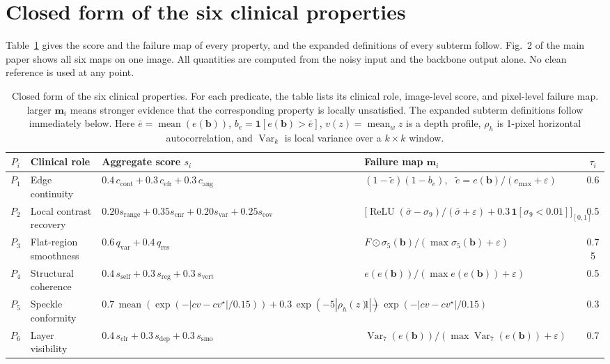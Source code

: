 \section{Closed form of the six clinical properties}
\label{sec:supp_predicates}
Table~\ref{tab:predicates_full} gives the score and the failure map of every property, and the
expanded definitions of every subterm follow. Fig.~2 of the main paper shows all six maps on one
image. All quantities are computed from the noisy input and the backbone output alone. No clean
reference is used at any point.

\begin{table}[t]
\centering
\caption{Closed form of the six clinical properties. For each predicate, the table lists its clinical role, image-level score, and pixel-level failure map. larger $\mathbf{m}_i$ means stronger evidence that the corresponding property is locally unsatisfied. The expanded subterm definitions follow immediately below. Here $\bar e=\operatorname{mean}(e(\mathbf{b}))$, $b_e=\mathbf{1}[e(\mathbf{b})>\bar e]$, $v(z)=\operatorname{mean}_w z$ is a depth profile, $\rho_h$ is 1-pixel horizontal autocorrelation, and $\operatorname{Var}_k$ is local variance over a $k\times k$ window.}
\label{tab:predicates_full}
\setlength{\tabcolsep}{2pt}
\footnotesize
\begin{tabular}{cp{}p{}p{}c}
\toprule
$P_i$ & Clinical role & Aggregate score $s_i$ & Failure map $\mathbf{m}_i$ & $\tau_i$ \\
\midrule
$P_1$ & Edge continuity &
$0.4\,c_{\text{cont}}+0.3\,c_{\text{efr}}+0.3\,c_{\text{ang}}$ &
$(1-\tilde e)(1-b_e)$, \ $\tilde e=e(\mathbf{b})/(e_{\max}+\varepsilon)$ &
0.6 \\
$P_2$ & Local contrast recovery &
$0.20 s_{\text{range}}\!+\!0.35 s_{\text{cnr}}\!+\!0.20 s_{\text{var}}\!+\!0.25 s_{\text{cov}}$ &
$\big[\operatorname{ReLU}(\bar\sigma-\sigma_9)/(\bar\sigma+\varepsilon) + 0.3\,\mathbf{1}[\sigma_9\!<\!0.01]\big]_{[0,1]}$\hspace*{-2pt} &
0.5 \\
$P_3$ & Flat-region smoothness &
$0.6\,q_{\text{var}}+0.4\,q_{\text{res}}$ &
$F \odot \sigma_5(\mathbf{b})/(\max \sigma_5(\mathbf{b})+\varepsilon)$ &
0.75 \\
$P_4$ & Structural coherence &
$0.4\,s_{\text{self}}+0.3\,s_{\text{reg}}+0.3\,s_{\text{vert}}$ &
$e(e(\mathbf{b}))/(\max e(e(\mathbf{b}))+\varepsilon)$ &
0.5 \\
$P_5$ & Speckle conformity &
$0.7\,\operatorname{mean}(\exp(-|cv-cv^\star|/0.15))+0.3\,\exp(-5|\rho_h(z)|)$ &
$1-\exp(-|cv-cv^\star|/0.15)$ &
0.3 \\
$P_6$ & Layer visibility &
$0.4\,s_{\text{clr}}+0.3\,s_{\text{dep}}+0.3\,s_{\text{smo}}$ &
$\operatorname{Var}_7(e(\mathbf{b}))/(\max \operatorname{Var}_7(e(\mathbf{b}))+\varepsilon)$ &
0.7 \\
\bottomrule
\end{tabular}
\end{table}

